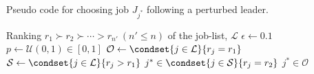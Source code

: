 \begin{algorithm}[t]
    \caption[Perturbed leader]{Pseudo code for choosing job 
    $J_{j^*}$ following a perturbed leader.}
    \label{pseudo:perturbedLeader}
    \begin{algorithmic}[1]
        \Require Ranking $r_1 \succ r_2 \succ \cdots > r_{n'} ~ (n' \leq n)$ of 
        the job-list, $\mathcal{L}$ 
        \State $\epsilon \gets 0.1$ 
        \State $p \gets \mathcal{U}(0,1)\in [0,1]$
        \State $\mathcal{O} \gets \condset{j\in\mathcal{L}}{r_j=r_1}$ 
        \State $\mathcal{S} \gets \condset{j\in\mathcal{L}}{r_j>r_1}$
        \State \Return $j^* \in \condset{j\in\mathcal{S}}{r_j=r_2}$ 
        \Else 
        \State \Return $j^* \in\mathcal{O}$ 
        \EndIf
        \EndProcedure
    \end{algorithmic}
\end{algorithm}